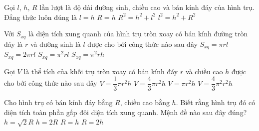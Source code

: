 \begin{ex}%
	Gọi $l$, $h$, $R$ lần lượt là độ dài đường sinh, chiều cao và bán kính đáy của hình trụ. Đẳng thức luôn đúng là
	\choice
	{\True	$l=h$}
	{$R=h$}
	{$R^2=h^2+l^2$}
	{$l^2=h^2+R^2$}
\end{ex}

\begin{ex}%
	Với $S_{xq}$ là diện tích xung quanh của hình trụ tròn xoay có bán kính đường tròn đáy là $ r $ và đường sinh là $ l $ được cho bởi công thức nào sau đây
	\choice
	{$S_{xq}=\pi rl$}
	{\True $S_{xq}=2\pi rl$}
	{$S_{xq}={\pi }^2 rl$}
	{$S_{xq}=\pi^2rh$}
\end{ex}

\begin{ex}%
	Gọi $ V $ là thể tích của khối trụ tròn xoay có bán kính đáy $ r $ và chiều cao $ h $ được cho bởi công thức nào sau đây
	\choice
	{\True $V=\dfrac{1}{3}\pi r^2h$}
	{$V=\dfrac{4}{3}\pi r^2h$}
	{$V=\pi r^2h$}
	{$V=\dfrac{4}{3}\pi ^2r^2h$}
\end{ex}

\begin{ex}%
	Cho hình trụ có bán kính đáy bằng $R$, chiều cao bằng $h$. Biết rằng hình trụ đó có diện tích toàn phần gấp đôi diện tích xung quanh. Mệnh đề nào sau đây đúng?
	\choice
	{$h=\sqrt{2}R$}
	{$h=2R$}
	{\True $R=h$}
	{$R=2h$}
\end{ex}

